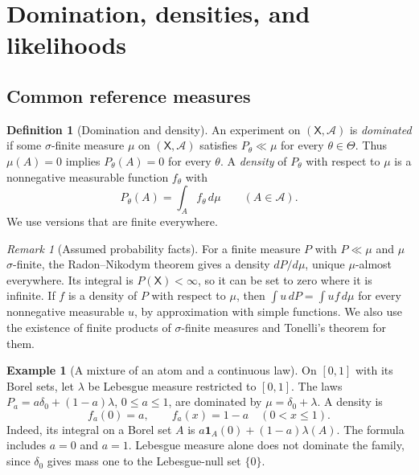 \documentclass[11pt,oneside]{book}
\theoremstyle{definition}
\newtheorem{definition}[theorem]{Definition}
\newtheorem{example}[theorem]{Example}
\theoremstyle{remark}
\newtheorem*{remark}{Remark}
\begin{document}
\clearpage
\section{Domination, densities, and likelihoods}
\label{sec:domination-likelihood}

\subsection{Common reference measures}
\label{subsec:domination}

\begin{definition}[Domination and density]
\label{def:dominated-experiment}
An experiment on $(\mathsf X,\mathcal A)$ is \emph{dominated} if some
$\sigma$-finite measure $\mu$ on $(\mathsf X,\mathcal A)$ satisfies
$P_\theta\ll\mu$ for every $\theta\in\Theta$. Thus $\mu(A)=0$ implies
$P_\theta(A)=0$ for every $\theta$. A \emph{density} of $P_\theta$
with respect to $\mu$ is a nonnegative measurable function $f_\theta$ with
\[
P_\theta(A)=\int_A f_\theta\,d\mu
\qquad(A\in\mathcal A).
\]
We use versions that are finite everywhere.
\end{definition}

\begin{remark}[Assumed probability facts]
For a finite measure $P$ with $P\ll\mu$ and $\mu$ $\sigma$-finite,
the Radon--Nikodym theorem gives a density $dP/d\mu$, unique $\mu$-almost
everywhere. Its integral is $P(\mathsf X)<\infty$, so it can be set to zero
where it is infinite. If $f$ is a density of $P$ with respect to $\mu$,
then $\int u\,dP=\int uf\,d\mu$ for every nonnegative measurable $u$,
by approximation with simple functions. We also use the existence of
finite products of $\sigma$-finite measures and Tonelli's theorem for them.
\end{remark}

\begin{example}[A mixture of an atom and a continuous law]
\label{ex:mixed-reference}
On $[0,1]$ with its Borel sets, let $\lambda$ be Lebesgue measure restricted
to $[0,1]$. The laws $P_a=a\delta_0+(1-a)\lambda$, $0\leq a\leq1$, are
dominated by $\mu=\delta_0+\lambda$. A density is
\[
f_a(0)=a,\qquad f_a(x)=1-a\quad(0<x\leq1).
\]
Indeed, its integral on a Borel set $A$ is
$a\mathbf 1_A(0)+(1-a)\lambda(A)$. The formula includes $a=0$ and $a=1$.
Lebesgue measure alone does not dominate the family, since $\delta_0$ gives
mass one to the Lebesgue-null set $\{0\}$.
\end{example}
\end{document}
